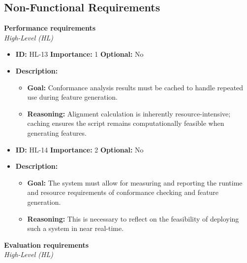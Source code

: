 \documentclass[12pt,a4paper]{article}
\begin{document}
\subsection{Non-Functional Requirements}

\noindent \textbf{Performance requirements}\\
\noindent \textit{High-Level (HL)}

\begin{itemize}
    \item \textbf{ID:} HL-13
 \textbf{Importance:} 1
 \textbf{Optional:} No
    \item \textbf{Description:}
    \begin{itemize}
        \item \textbf{Goal:} Conformance analysis results must be cached to handle repeated use during feature generation.
        \item \textbf{Reasoning:} Alignment calculation is inherently resource-intensive; caching ensures the script remains computationally feasible when generating features.
    \end{itemize}
\end{itemize}
\vspace{1.5em}

\begin{itemize}
    \item \textbf{ID:} HL-14
 \textbf{Importance:} 2
 \textbf{Optional:} No
    \item \textbf{Description:}
    \begin{itemize}
        \item \textbf{Goal:} The system must allow for measuring and reporting the runtime and resource requirements of conformance checking and feature generation.
        \item \textbf{Reasoning:} This is necessary to reflect on the feasibility of deploying such a system in near real-time.
    \end{itemize}
\end{itemize}
\vspace{1.5em}

\noindent \textbf{Evaluation requirements}\\
\noindent \textit{High-Level (HL)}
\end{document}

